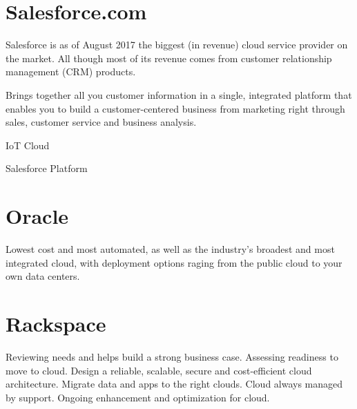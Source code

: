 \section{Salesforce.com}
Salesforce is as of August 2017 the biggest (in revenue) cloud service provider on the market. All though most of its revenue comes from customer relationship management (CRM) products. 

Brings together all you customer information in a single, integrated platform that enables you to build a customer-centered business from marketing right through sales, customer service and business analysis. 

IoT Cloud %

Salesforce Platform 

\section{Oracle}
Lowest cost and most automated, as well as the industry's broadest and most integrated cloud, with deployment options raging from the public cloud to your own data centers. 

\section{Rackspace}
Reviewing needs and helps build a strong business case. Assessing readiness to move to cloud. Design a reliable, scalable, secure and cost-efficient cloud architecture. Migrate data and apps to the right clouds. Cloud always managed by support. Ongoing enhancement and optimization for cloud. 
